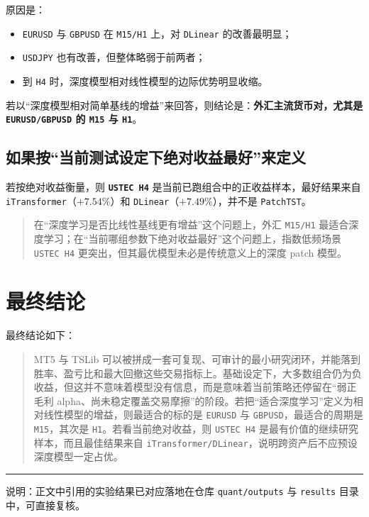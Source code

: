 \documentclass[11pt,a4paper]{ctexart}
\begin{document}
原因是：
\begin{itemize}
  \item \texttt{EURUSD} 与 \texttt{GBPUSD} 在 \texttt{M15/H1} 上，对 \texttt{DLinear} 的改善最明显；
  \item \texttt{USDJPY} 也有改善，但整体略弱于前两者；
  \item 到 \texttt{H4} 时，深度模型相对线性模型的边际优势明显收缩。
\end{itemize}

若以“深度模型相对简单基线的增益”来回答，则结论是：\textbf{外汇主流货币对，尤其是 \texttt{EURUSD/GBPUSD} 的 \texttt{M15} 与 \texttt{H1}}。

\subsection{如果按“当前测试设定下绝对收益最好”来定义}

若按绝对收益衡量，则 \textbf{\texttt{USTEC H4}} 是当前已跑组合中的正收益样本，最好结果来自 \texttt{iTransformer}（\(+7.54\%\)）和 \texttt{DLinear}（\(+7.49\%\)），并不是 \texttt{PatchTST}。

\begin{quote}
在“深度学习是否比线性基线更有增益”这个问题上，外汇 \texttt{M15/H1} 最适合深度学习；在“当前哪组参数下绝对收益最好”这个问题上，指数低频场景 \texttt{USTEC H4} 更突出，但其最优模型未必是传统意义上的深度 patch 模型。
\end{quote}

\section{最终结论}

最终结论如下：

\begin{quote}
MT5 与 TSLib 可以被拼成一套可复现、可审计的最小研究闭环，并能落到胜率、盈亏比和最大回撤这些交易指标上。基础设定下，大多数组合仍为负收益，但这并不意味着模型没有信息，而是意味着当前策略还停留在“弱正毛利 alpha、尚未稳定覆盖交易摩擦”的阶段。若把“适合深度学习”定义为相对线性模型的增益，则最适合的标的是 \texttt{EURUSD} 与 \texttt{GBPUSD}，最适合的周期是 \texttt{M15}，其次是 \texttt{H1}。若看当前绝对收益，则 \texttt{USTEC H4} 是最有价值的继续研究样本，而且最佳结果来自 \texttt{iTransformer/DLinear}，说明跨资产后不应预设深度模型一定占优。
\end{quote}


\vspace{0.8em}
\hrule
\vspace{0.7em}

{\small
说明：正文中引用的实验结果已对应落地在仓库 \texttt{quant/outputs} 与 \texttt{results} 目录中，可直接复核。}
\end{document}
